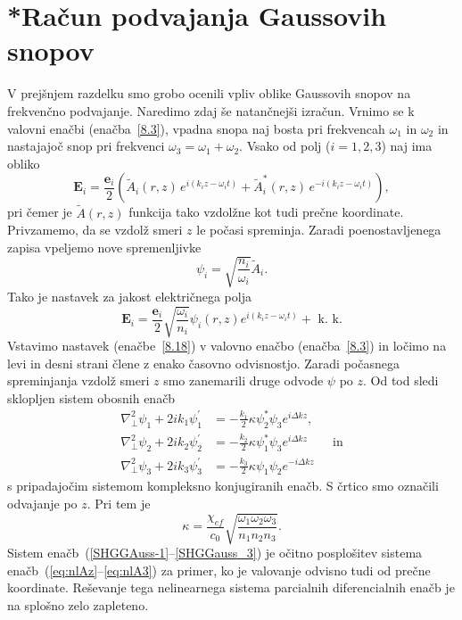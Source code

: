 \section{{*}Račun podvajanja Gaussovih snopov}
V prejšnjem razdelku smo grobo ocenili vpliv oblike Gaussovih snopov
na frekvenčno podvajanje. Naredimo zdaj še natančnejši izračun. Vrnimo se k valovni
enačbi (enačba~\ref{8.3}), vpadna snopa naj bosta pri frekvencah
$\omega_{1}$ in $\omega_{2}$ in nastajajoč snop pri frekvenci
$\omega_{3}=\omega_{1}+\omega_{2}$.
Vsako od polj ($i=1,2,3$) naj ima obliko 
\begin{equation}
\mathbf{E}_{i}  = \frac{\mathbf{e}_{i}}{2}\left(\tilde{A}_{i}(r,z)\, 
e^{i(k_{i}z-\omega_{i}t)}+\tilde{A}_{i}^{*}(r,z)\, e^{-i(k_{i}z-\omega_{i}t)}\right),
\end{equation}
pri čemer je $\tilde{A}(r,z)$ funkcija tako vzdolžne kot tudi prečne koordinate. Privzamemo, 
da se vzdolž smeri  $z$ le počasi spreminja.
Zaradi poenostavljenega zapisa vpeljemo nove spremenljivke 
\begin{equation}
\psi_i = \sqrt{\frac{n_i}{\omega_i}}\tilde{A}_i.
\end{equation}
Tako je nastavek za jakost električnega polja
\begin{equation}
\mathbf{E}_{i}=\frac{\mathbf{e}_{i}}{2}\sqrt{\frac{\omega_{i}}{n_{i}}}\psi_{i}(r,z)
e^{i(k_{i}z-\omega_{i}t)}+\mbox{ k. k.}
\label{8.18}
\end{equation}
Vstavimo nastavek (enačbe~\ref{8.18}) v valovno
enačbo (enačba~\ref{8.3}) in ločimo na levi in desni strani člene z enako časovno odvisnostjo.
Zaradi počasnega spreminjanja vzdolž smeri $z$ smo zanemarili druge odvode 
$\psi$ po $z$. Od tod sledi sklopljen sistem obosnih enačb 
\begin{align}
\nabla_{\perp}^{2}\psi_{1}+2ik_{1}\psi_{1}^{\prime} & =  -
\frac{k_{1}}{2}\kappa\psi_{2}^{\ast}\psi_{3}e^{i\Delta kz},\label{SHGGAuss-1}\\
\nabla_{\perp}^{2}\psi_{2}+2ik_{2}\psi_{2}^{\prime} & =  -
\frac{k_{2}}{2}\kappa\psi_{1}^{\ast}\psi_{3}e^{i\Delta kz} \qquad \mathrm{in}\\
\nabla_{\perp}^{2}\psi_{3}+2ik_{3}\psi_{3}^{\prime} & =
 - \frac{k_{3}}{2}\kappa\psi_{1}\psi_{2}e^{-i\Delta kz}
\label{SHGGauss_3}
\end{align}
s pripadajočim sistemom kompleksno konjugiranih enačb. S črtico smo označili odvajanje po $z$. 
Pri tem je 
\begin{equation}
\kappa=\frac{\chi_{ef}}{c_0} \sqrt{\frac{\omega_{1}\omega_{2}\omega_{3}}{n_{1}n_{2}n_{3}}}.
\label{8.20}
\end{equation}
Sistem enačb~(\ref{SHGGAuss-1}--\ref{SHGGauss_3}) je očitno
posplošitev sistema enačb~(\ref{eq:nlAz}--\ref{eq:nlA3}) za primer, ko je valovanje odvisno
tudi od prečne koordinate. Reševanje tega nelinearnega sistema parcialnih
diferencialnih enačb je na splošno zelo zapleteno.

